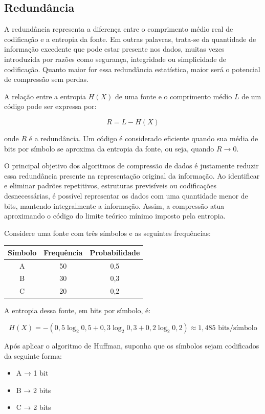 \newpage
\subsection{Redundância}

A redundância representa a diferença entre o comprimento médio real de codificação e a entropia da fonte. Em outras palavras, trata-se da quantidade de informação excedente que pode estar presente nos dados, muitas vezes introduzida por razões como segurança, integridade ou simplicidade de codificação. Quanto maior for essa redundância estatística, maior será o potencial de compressão sem perdas.

A relação entre a entropia \( H(X) \) de uma fonte e o comprimento médio \( L \) de um código pode ser expressa por:

\[
R = L - H(X)
\]

onde \( R \) é a redundância. Um código é considerado eficiente quando sua média de bits por símbolo se aproxima da entropia da fonte, ou seja, quando \( R \to 0 \).

O principal objetivo dos algoritmos de compressão de dados é justamente reduzir essa redundância presente na representação original da informação. Ao identificar e eliminar padrões repetitivos, estruturas previsíveis ou codificações desnecessárias, é possível representar os dados com uma quantidade menor de bits, mantendo integralmente a informação. Assim, a compressão atua aproximando o código do limite teórico mínimo imposto pela entropia.

Considere uma fonte com três símbolos e as seguintes frequências:

\begin{center}
\begin{tabular}{ccc}
\toprule
Símbolo & Frequência & Probabilidade \\
\midrule
A & 50 & 0{,}5 \\
B & 30 & 0{,}3 \\
C & 20 & 0{,}2 \\
\bottomrule
\end{tabular}
\end{center}

A entropia dessa fonte, em bits por símbolo, é:

\[
H(X) = - (0{,}5 \log_2 0{,}5 + 0{,}3 \log_2 0{,}3 + 0{,}2 \log_2 0{,}2) \approx 1{,}485 \text{ bits/símbolo}
\]

Após aplicar o algoritmo de Huffman, suponha que os símbolos sejam codificados da seguinte forma:
\begin{itemize}
    \item A → 1 bit
    \item B → 2 bits
    \item C → 2 bits
\end{itemize}

